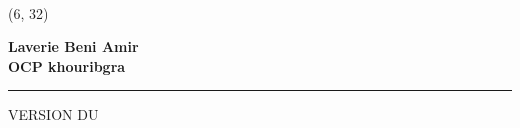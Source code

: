 \thispagestyle{empty}
\AddToShipoutPicture*{\BackgroundPic}
\vspace*{-2cm}

\\[2.3cm]



\begin{textblock}{11}(6, 32)
	\begin{flushleft}
	
	\fontsize{28}{0}\selectfont
	\color{TextColor}
	\textbf{\Agency \hspace*{2mm} Laverie Beni Amir }
	\newline\\[1cm]
	\textbf{\Agency \hspace*{2mm}  OCP khouribgra  }
	\end{flushleft}		
\end{textblock}
{ \color{TextColor}\hspace{5.4cm}\rule[-180pt]{1pt}{3.5cm}}
  
\vspace{12cm}
  
\hspace{12cm}\colorbox{Mycolor1}{\color{Mycolor2}VERSION DU \version } 
  
